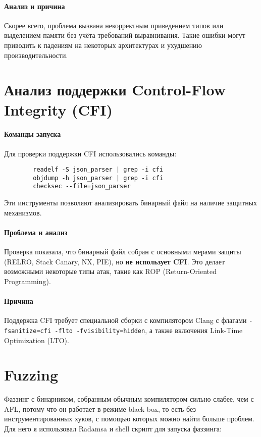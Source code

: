     \paragraph{Анализ и причина} Скорее всего, проблема вызвана некорректным приведением типов или выделением памяти без учёта требований выравнивания.
    Такие ошибки могут приводить к падениям на некоторых архитектурах и ухудшению производительности.


    \section{Анализ поддержки Control-Flow Integrity (CFI)}

    \paragraph{Команды запуска} Для проверки поддержки CFI использовались команды:
    \begin{verbatim}
        readelf -S json_parser | grep -i cfi
        objdump -h json_parser | grep -i cfi
        checksec --file=json_parser
    \end{verbatim}

    Эти инструменты позволяют анализировать бинарный файл на наличие защитных механизмов.

    \paragraph{Проблема и анализ} Проверка показала, что бинарный файл собран с основными мерами защиты (RELRO, Stack Canary, NX, PIE), но \textbf{не использует CFI}.
    Это делает возможными некоторые типы атак, такие как ROP (Return-Oriented Programming).

    \paragraph{Причина} Поддержка CFI требует специальной сборки с компилятором Clang с флагами \texttt{-fsanitize=cfi -flto -fvisibility=hidden}, а также включения Link-Time Optimization (LTO).


    \section{Fuzzing}

    Фаззинг с бинарником, собранным обычным компилятором сильно слабее, чем с AFL, потому что он работает в режиме
    black-box, то есть без инструментированных хуков, с помощью которых можно найти больше проблем.
    Для него я использовал Radamsa и shell скрипт для запуска фаззинга:

